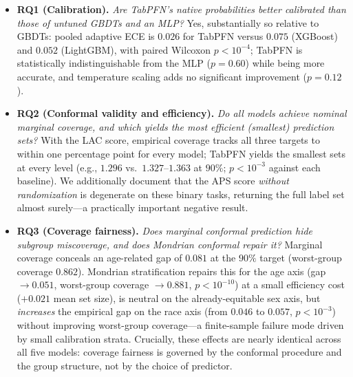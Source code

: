 \documentclass[review,12pt]{elsarticle}
\begin{document}
\begin{itemize}
  \item \textbf{RQ1 (Calibration).} \emph{Are TabPFN's native probabilities better calibrated than those of untuned GBDTs and an MLP?} Yes, substantially so relative to GBDTs: pooled adaptive ECE is $0.026$ for TabPFN versus $0.075$ (XGBoost) and $0.052$ (LightGBM), with paired Wilcoxon $p<10^{-4}$; TabPFN is statistically indistinguishable from the MLP ($p=0.60$) while being more accurate, and temperature scaling adds no significant improvement ($p=0.12$).
  \item \textbf{RQ2 (Conformal validity and efficiency).} \emph{Do all models achieve nominal marginal coverage, and which yields the most efficient (smallest) prediction sets?} With the LAC score, empirical coverage tracks all three targets to within one percentage point for every model; TabPFN yields the smallest sets at every level (e.g., $1.296$ vs.\ $1.327$--$1.363$ at $90\%$; $p<10^{-3}$ against each baseline). We additionally document that the APS score \emph{without randomization} is degenerate on these binary tasks, returning the full label set almost surely---a practically important negative result.
  \item \textbf{RQ3 (Coverage fairness).} \emph{Does marginal conformal prediction hide subgroup miscoverage, and does Mondrian conformal repair it?} Marginal coverage conceals an age-related gap of $0.081$ at the $90\%$ target (worst-group coverage $0.862$). Mondrian stratification repairs this for the age axis (gap $\to 0.051$, worst-group coverage $\to 0.881$, $p<10^{-10}$) at a small efficiency cost ($+0.021$ mean set size), is neutral on the already-equitable sex axis, but \emph{increases} the empirical gap on the race axis (from $0.046$ to $0.057$, $p<10^{-3}$) without improving worst-group coverage---a finite-sample failure mode driven by small calibration strata. Crucially, these effects are nearly identical across all five models: coverage fairness is governed by the conformal procedure and the group structure, not by the choice of predictor.
\end{itemize}
\end{document}
